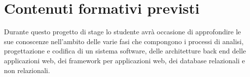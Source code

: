 \section*{Contenuti formativi previsti}
Durante questo progetto di stage lo studente avrà occasione di 
approfondire le sue conoscenze nell'ambito delle varie fasi che
compongono i processi di analisi, progettazione e codifica di un
sistema software, delle architetture back end delle applicazioni web, 
dei framework per applicazioni web, dei database relazionali e non relazionali.
\newpage